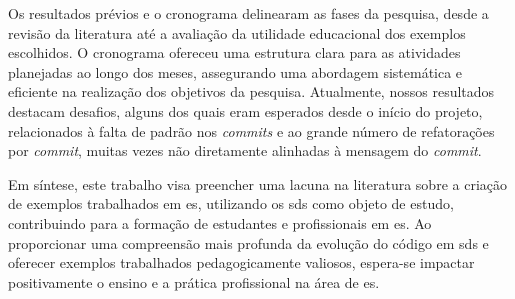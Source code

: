 Os resultados prévios e o cronograma delinearam as fases da pesquisa, desde a revisão da literatura até a avaliação da utilidade educacional dos exemplos escolhidos. O cronograma ofereceu uma estrutura clara para as atividades planejadas ao longo dos meses, assegurando uma abordagem sistemática e eficiente na realização dos objetivos da pesquisa. Atualmente, nossos resultados destacam desafios, alguns dos quais eram esperados desde o início do projeto, relacionados à falta de padrão nos \textit{commits} e ao grande número de refatorações por \textit{commit}, muitas vezes não diretamente alinhadas à mensagem do \textit{commit}.

Em síntese, este trabalho visa preencher uma lacuna na literatura sobre a criação de exemplos trabalhados em \gls{es}, utilizando os \gls{sds} como objeto de estudo, contribuindo para a formação de estudantes e profissionais em \gls{es}. Ao proporcionar uma compreensão mais profunda da evolução do código em \gls{sds} e oferecer exemplos trabalhados pedagogicamente valiosos, espera-se impactar positivamente o ensino e a prática profissional na área de \gls{es}.
